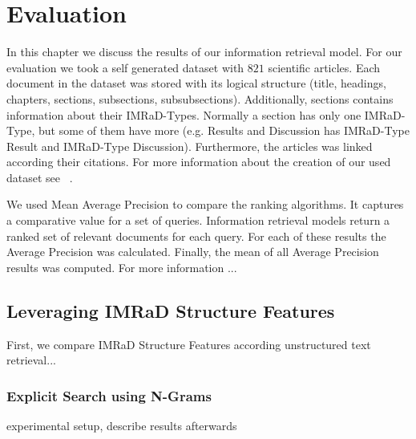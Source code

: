 \chapter{Evaluation}
\label{cha:evaluation}

In this chapter we discuss the results of our information retrieval model. For our evaluation we took a self generated dataset with $821$ scientific articles. Each document in the dataset was stored with its logical structure (title, headings, chapters, sections, subsections, subsubsections). Additionally, sections contains information about their IMRaD-Types. Normally a section has only one IMRaD-Type, but some of them have more (e.g. Results and Discussion has IMRaD-Type Result and IMRaD-Type Discussion). Furthermore, the articles was linked according their citations. For more information about the creation of our used dataset see ~.

We used Mean Average Precision to compare the ranking algorithms. It captures a comparative value for a set of queries. Information retrieval models return a ranked set of relevant documents for each query. For each of these results the Average Precision was calculated. Finally, the mean of all Average Precision results was computed. For more information ...

\section{Leveraging IMRaD Structure Features}

First, we compare IMRaD Structure Features according unstructured text retrieval...

\subsection{Explicit Search using N-Grams}

experimental setup, describe results afterwards

